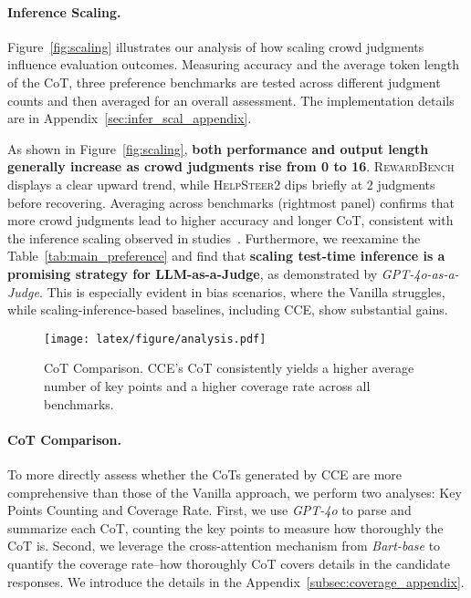 \paragraph{Inference Scaling.} 
Figure~\ref{fig:scaling} illustrates our analysis of how scaling crowd judgments influence evaluation outcomes. Measuring accuracy and the average token length of the CoT, three preference benchmarks are tested across different judgment counts and then averaged for an overall assessment. The implementation details are in Appendix~\ref{sec:infer_scal_appendix}.

As shown in Figure~\ref{fig:scaling}, \textbf{both performance and output length generally increase as crowd judgments rise from 0 to 16}. \textsc{RewardBench} displays a clear upward trend, while \textsc{HelpSteer2} dips briefly at 2 judgments before recovering. Averaging across benchmarks (rightmost panel) confirms that more crowd judgments lead to higher accuracy and longer CoT, consistent with the inference scaling observed in studies~\citep{brown2024largelanguagemonkeysscaling,snell2025scaling}.
Furthermore, we reexamine the Table~\ref{tab:main_preference} and find that \textbf{scaling test-time inference is a promising strategy for LLM-as-a-Judge}, as demonstrated by \textit{GPT-4o-as-a-Judge}. This is especially evident in bias scenarios, where the Vanilla struggles, while scaling-inference-based baselines, including \textsc{CCE}, show substantial gains.

\begin{figure}[t]
\centering
  \texttt{[image: latex/figure/analysis.pdf]}
  \caption {CoT Comparison. \textsc{CCE}’s CoT consistently yields a higher average number of key points and a higher coverage rate across all benchmarks.}
  \vspace{-.5em}
  \label{fig:cot_comp}
\end{figure}


\paragraph{CoT Comparison.} To more directly assess whether the CoTs generated by \textsc{CCE} are more comprehensive than those of the Vanilla approach, we perform two analyses: Key Points Counting and Coverage Rate. First, we use \textit{GPT-4o} to parse and summarize each CoT, counting the key points to measure how thoroughly the CoT is. Second, we leverage the cross-attention mechanism from \textit{Bart-base} to quantify the coverage rate--how thoroughly CoT covers details in the candidate responses. We introduce the details in the Appendix~\ref{subsec:coverage_appendix}.

